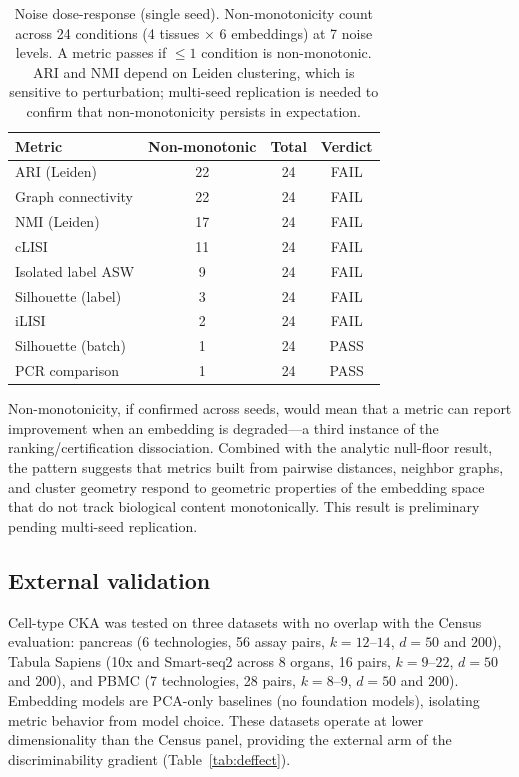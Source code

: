 \documentclass[11pt]{article}
\begin{document}
\begin{table}[t]
\centering
\caption{Noise dose-response (single seed). Non-monotonicity count
across 24 conditions (4 tissues $\times$ 6 embeddings) at 7 noise
levels. A metric passes if $\leq 1$ condition is non-monotonic. ARI
and NMI depend on Leiden clustering, which is sensitive to
perturbation; multi-seed replication is needed to confirm that
non-monotonicity persists in expectation.}
\label{tab:noise}
\small
\begin{tabular}{@{}lccc@{}}
\toprule
Metric & Non-monotonic & Total & Verdict \\
\midrule
ARI (Leiden)         & 22 & 24 & FAIL \\
Graph connectivity   & 22 & 24 & FAIL \\
NMI (Leiden)         & 17 & 24 & FAIL \\
cLISI                & 11 & 24 & FAIL \\
Isolated label ASW   &  9 & 24 & FAIL \\
Silhouette (label)   &  3 & 24 & FAIL \\
iLISI                &  2 & 24 & FAIL \\
\midrule
Silhouette (batch)   &  1 & 24 & PASS \\
PCR comparison       &  1 & 24 & PASS \\
\bottomrule
\end{tabular}
\end{table}

Non-monotonicity, if confirmed across seeds, would mean that a metric
can report improvement when an embedding is degraded---a third instance
of the ranking/certification dissociation. Combined with the analytic
null-floor result, the pattern suggests that metrics built from pairwise
distances, neighbor graphs, and cluster geometry respond to geometric
properties of the embedding space that do not track biological content
monotonically. This result is preliminary pending multi-seed
replication.


\subsection{External validation}
\label{sec:external}

Cell-type CKA was tested on three datasets with no overlap with the
Census evaluation: pancreas \citep{luecken2022scib} (6 technologies, 56
assay pairs, $k = 12$--$14$, $d = 50$ and $200$), Tabula Sapiens
\citep{tabulasapiens2022} (10x and Smart-seq2 across 8 organs, 16
pairs, $k = 9$--$22$, $d = 50$ and $200$), and PBMC
\citep{ding2020systematic} (7 technologies, 28 pairs, $k = 8$--$9$,
$d = 50$ and $200$). Embedding models are PCA-only baselines (no
foundation models), isolating metric behavior from model choice. These
datasets operate at lower dimensionality than the Census panel,
providing the external arm of the discriminability gradient
(Table~\ref{tab:deffect}).
\end{document}
